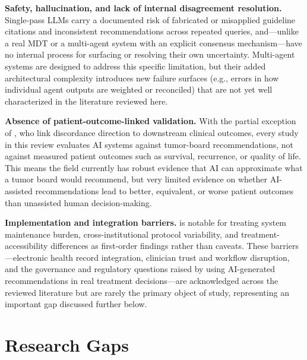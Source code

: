 \documentclass{article}
\begin{document}
\textbf{Safety, hallucination, and lack of internal disagreement resolution.} Single-pass LLMs carry a documented risk of fabricated or misapplied guideline citations and inconsistent recommendations across repeated queries, and---unlike a real MDT or a multi-agent system with an explicit consensus mechanism---have no internal process for surfacing or resolving their own uncertainty. Multi-agent systems are designed to address this specific limitation, but their added architectural complexity introduces new failure surfaces (e.g., errors in how individual agent outputs are weighted or reconciled) that are not yet well characterized in the literature reviewed here.

\textbf{Absence of patient-outcome-linked validation.} With the partial exception of \citet{aliyev2026}, who link discordance direction to downstream clinical outcomes, every study in this review evaluates AI systems against tumor-board recommendations, not against measured patient outcomes such as survival, recurrence, or quality of life. This means the field currently has robust evidence that AI can approximate what a tumor board would recommend, but very limited evidence on whether AI-assisted recommendations lead to better, equivalent, or worse patient outcomes than unassisted human decision-making.

\textbf{Implementation and integration barriers.} \citet{wu2026} is notable for treating system maintenance burden, cross-institutional protocol variability, and treatment-accessibility differences as first-order findings rather than caveats. These barriers---electronic health record integration, clinician trust and workflow disruption, and the governance and regulatory questions raised by using AI-generated recommendations in real treatment decisions---are acknowledged across the reviewed literature but are rarely the primary object of study, representing an important gap discussed further below.

\section{Research Gaps}
\label{sec:gaps}
\end{document}

